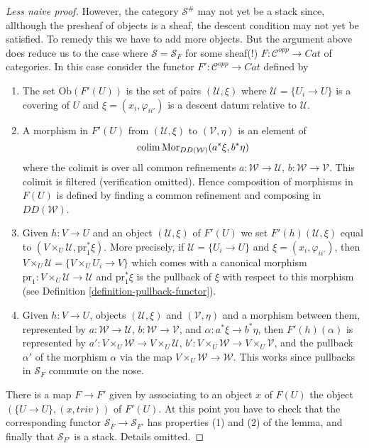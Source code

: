 \begin{proof}[Less naive proof]
\medskip\noindent
However, the category $\mathcal{S}^\#$ may not yet be a
stack since, allthough the presheaf of objects is a sheaf,
the descent condition may not yet be satisfied.
To remedy this we have to add more objects. But the argument
above does reduce us to the case where $\mathcal{S} = \mathcal{S}_F$
for some sheaf(!) $F : \mathcal{C}^{opp} \to \textit{Cat}$ of
categories. In this case consider the functor
$F' : \mathcal{C}^{opp} \to \textit{Cat}$ defined by
\begin{enumerate}
\item The set $\text{Ob}(F'(U))$ is the set of pairs
$(\mathcal{U}, \xi)$ where $\mathcal{U} = \{U_i \to U\}$
is a covering of $U$ and $\xi = (x_i, \varphi_{ii'})$ is
a descent datum relative to $\mathcal{U}$.
\item A morphism in $F'(U)$ from
$(\mathcal{U}, \xi)$ to $(\mathcal{V}, \eta)$
is an element of
$$
\mathop{\rm colim}\nolimits \text{Mor}_{DD(\mathcal{W})}(a^*\xi, b^*\eta)
$$
where the colimit is over all common refinements
$a : \mathcal{W} \to \mathcal{U}$, $b : \mathcal{W} \to \mathcal{V}$.
This colimit is filtered (verification omitted).
Hence composition of morphisms in $F(U)$ is defined by
finding a common refinement and composing in $DD(\mathcal{W})$.
\item Given $h : V \to U$ and an object
$(\mathcal{U}, \xi)$ of $F'(U)$ we set $F'(h)(\mathcal{U}, \xi)$
equal to $(V \times_U \mathcal{U}, \text{pr}_1^*\xi)$.
More precisely, if $\mathcal{U} = \{U_i \to U\}$
and $\xi = (x_i, \varphi_{ii'})$, then
$V \times_U \mathcal{U} = \{V \times_U U_i \to V\}$
which comes with a canonical morphism
$\text{pr}_1 : V \times_U \mathcal{U} \to \mathcal{U}$ and
$\text{pr}_1^*\xi$ is the pullback of $\xi$ with respect to
this morphism (see Definition \ref{definition-pullback-functor}).
\item Given $h : V \to U$, objects $(\mathcal{U}, \xi)$ 
and $(\mathcal{V}, \eta)$ and a morphism between them, represented by
$a : \mathcal{W} \to \mathcal{U}$, $b : \mathcal{W} \to \mathcal{V}$,
and $\alpha : a^*\xi \to b^*\eta$, then $F'(h)(\alpha)$ is
represented by
$a' : V\times_U\mathcal{W} \to V\times_U\mathcal{U}$,
$b' : V\times_U\mathcal{W} \to V\times_U\mathcal{V}$,
and the pullback $\alpha'$ of the morphism $\alpha$ via
the map $V \times_U \mathcal{W} \to \mathcal{W}$. This works
since pullbacks in $\mathcal{S}_F$ commute on the nose.
\end{enumerate}
There is a map $F \to F'$ given by associating to
an object $x$ of $F(U)$ the object $(\{U \to U\}, (x, triv))$ of
$F'(U)$. At this point you have to check that the corresponding
functor $\mathcal{S}_F \to \mathcal{S}_{F'}$ has properties (1)
and (2) of the lemma, and finally that $\mathcal{S}_{F'}$ is
a stack. Details omitted.
\end{proof}

